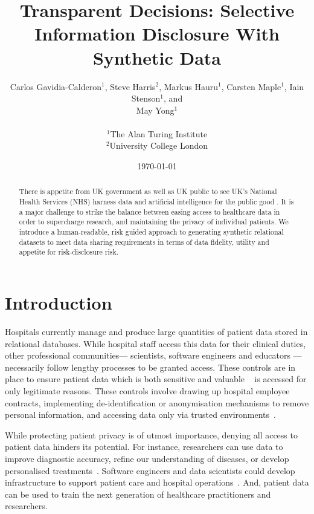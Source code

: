 \documentclass[11pt]{article}
\begin{document}
\title{Transparent Decisions: Selective Information Disclosure With Synthetic Data}
\author{
Carlos Gavidia-Calderon$^1$, Steve Harris$^2$, Markus Hauru$^1$, Carsten Maple$^1$, Iain Stenson$^1$, and \\ May Yong$^1$ \\~\\
$^1$The Alan Turing Institute \\
$^2$University College London
}
\date{\today} %
\maketitle
\begin{abstract}
There is appetite from UK government as well as UK public to see UK's National Health Services (NHS) harness data and artificial intelligence for the public good \cite{gov2022datasaves}\cite{Jones2022}. It is a major challenge to strike the balance between easing access to healthcare data in order to supercharge research, and maintaining the privacy of individual patients. We introduce a human-readable, risk guided approach to generating synthetic relational datasets to meet data sharing requirements in terms of data fidelity, utility and appetite for risk-disclosure risk.
\end{abstract}

\section{Introduction}

Hospitals currently manage and produce large quantities of
patient data stored in relational databases. While hospital staff access this data for their clinical duties, other professional communities--- scientists, software engineers and educators --- necessarily follow lengthy processes to be granted access. These controls are in place to ensure patient data which is both sensitive and valuable ~\cite{schomerus2022} is accessed for only legitimate reasons.
These controls involve drawing up hospital employee contracts, implementing de-identification or anonymisation mechanisms to remove personal information, and accessing data only via trusted environments~\cite{harris2022}.

While protecting patient privacy is of utmost importance, denying all access to 
patient data hinders its potential.
For instance, researchers can use data to improve diagnostic accuracy, refine our understanding of diseases, or develop personalised treatments~\cite{tucker2020}. Software engineers and data scientists could develop infrastructure to support patient care and hospital operations~\cite{harris2022}. And, patient data can be used to train the next generation of healthcare practitioners and researchers.
\end{document}
